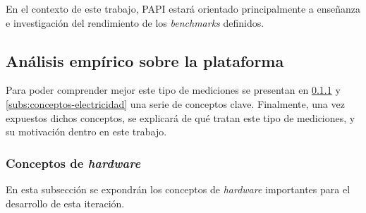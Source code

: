 En el contexto de este trabajo, \ac{PAPI} estará orientado principalmente a enseñanza e investigación del rendimiento de los \textit{benchmarks} definidos. 

\subsection{Análisis empírico sobre la plataforma}

Para poder comprender mejor este tipo de mediciones se presentan en \ref{subs:conceptos-hw} y \ref{subs:conceptos-electricidad} una serie de conceptos clave. Finalmente, una vez expuestos dichos conceptos, se explicará de qué tratan este tipo de mediciones, y su motivación dentro en este trabajo.

\subsubsection{Conceptos de \textit{hardware}}
\label{subs:conceptos-hw}

En esta subsección se expondrán los conceptos de \textit{hardware} importantes para el desarrollo de esta iteración.

